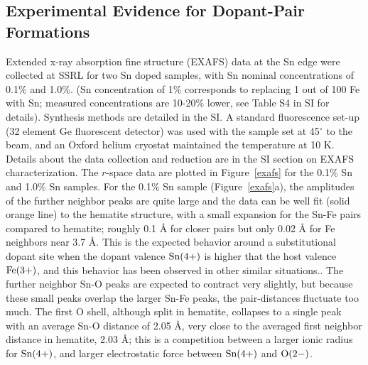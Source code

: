 \subsection{Experimental Evidence for Dopant-Pair Formations}

Extended x-ray absorption fine structure (EXAFS) data at the Sn edge were collected at SSRL for two Sn doped  samples, with Sn nominal concentrations of 0.1\% and 1.0\%. (Sn concentration of 1\% corresponds to replacing 1 out of 100 Fe with Sn; measured concentrations are 10-20\% lower, see Table S4 in SI for details). Synthesis methods are detailed in the SI. A standard fluorescence set-up (32 element Ge fluorescent detector) was used with the sample set at 45$^{\circ}$ to the beam, and an Oxford helium cryostat maintained the temperature at 10 K. Details about the data collection and reduction are in the SI section on EXAFS characterization. The $r$-space data are plotted in Figure~\ref{exafs} for the 0.1\% Sn and 1.0\% Sn samples. For the 0.1\% Sn sample (Figure~\ref{exafs}a), the amplitudes of the further neighbor peaks are quite large and the data can be well fit (solid orange line) to the hematite structure, with a small expansion for the Sn-Fe pairs compared to hematite;  roughly 0.1 {\AA} for closer pairs but only 0.02 {\AA} for Fe neighbors near 3.7 {\AA}. This is the expected behavior around a substitutional dopant site when the dopant valence $\rm Sn(4+)$ is higher that the host valence $\rm Fe(3+)$, and this behavior has been observed in other similar situations.\cite{mackeen2018substitution}. The further neighbor Sn-O peaks are expected to contract very slightly, but because these small peaks overlap the larger Sn-Fe peaks, the pair-distances fluctuate too much. The first O shell, although split in hematite, collapses to a single peak with an average Sn-O distance of 2.05 {\AA}, very close to the averaged first neighbor distance in hematite, 2.03 {\AA}; this is a competition between a larger ionic radius for $\rm Sn(4+)$, and larger electrostatic force between $\rm Sn(4+)$ and $\rm O(2-)$.

